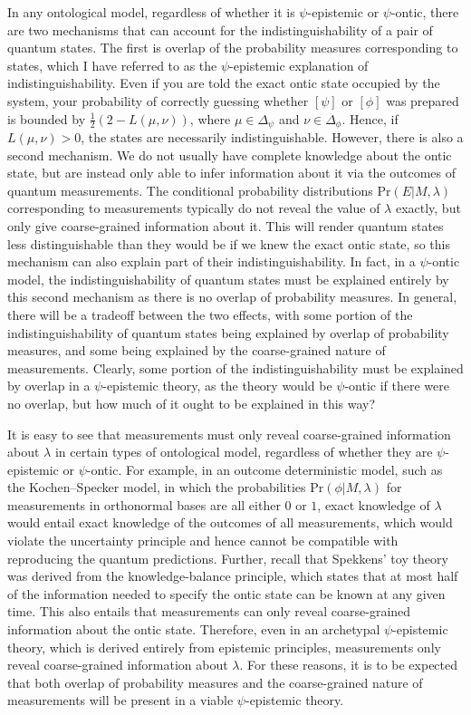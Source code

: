 \documentclass[DIV=calc,fontsize=12pt]{scrartcl} %
\theoremstyle{definition}
\theoremstyle{plain}
\newcommand{\Proj}[1]{\ensuremath{\left [ #1 \right ]}}
\begin{document}
In any ontological model, regardless of whether it is $\psi$-epistemic
or $\psi$-ontic, there are two mechanisms that can account for the
indistinguishability of a pair of quantum states.  The first is
overlap of the probability measures corresponding to states, which I
have referred to as the $\psi$-epistemic explanation of
indistinguishability.  Even if you are told the exact ontic state
occupied by the system, your probability of correctly guessing whether
$\Proj{\psi}$ or $\Proj{\phi}$ was prepared is bounded by $\frac{1}{2}
\left ( 2 - L(\mu,\nu) \right )$, where $\mu \in \Delta_{\psi}$ and
$\nu \in \Delta_{\phi}$.  Hence, if $L(\mu,\nu) > 0$, the states are
necessarily indistinguishable.  However, there is also a second
mechanism.  We do not usually have complete knowledge about the ontic
state, but are instead only able to infer information about it via the
outcomes of quantum measurements.  The conditional probability
distributions $\text{Pr}(E|M,\lambda)$ corresponding to measurements
typically do not reveal the value of $\lambda$ exactly, but only give
coarse-grained information about it.  This will render quantum states
less distinguishable than they would be if we knew the exact ontic
state, so this mechanism can also explain part of their
indistinguishability.  In fact, in a $\psi$-ontic model, the
indistinguishability of quantum states must be explained entirely by
this second mechanism as there is no overlap of probability measures.
In general, there will be a tradeoff between the two effects, with
some portion of the indistinguishability of quantum states being
explained by overlap of probability measures, and some being explained
by the coarse-grained nature of measurements.  Clearly, some portion
of the indistinguishability must be explained by overlap in a
$\psi$-epistemic theory, as the theory would be $\psi$-ontic if there
were no overlap, but how much of it ought to be explained in this way?

It is easy to see that measurements must only reveal coarse-grained
information about $\lambda$ in certain types of ontological model,
regardless of whether they are $\psi$-epistemic or $\psi$-ontic.  For
example, in an outcome deterministic model, such as the Kochen--Specker
model, in which the probabilities $\text{Pr}(\phi|M,\lambda)$ for
measurements in orthonormal bases are all either $0$ or $1$, exact
knowledge of $\lambda$ would entail exact knowledge of the outcomes of
all measurements, which would violate the uncertainty principle and
hence cannot be compatible with reproducing the quantum predictions.
Further, recall that Spekkens' toy theory was derived from the
knowledge-balance principle, which states that at most half of the
information needed to specify the ontic state can be known at any
given time.  This also entails that measurements can only reveal
coarse-grained information about the ontic state.  Therefore, even in
an archetypal $\psi$-epistemic theory, which is derived entirely from
epistemic principles, measurements only reveal coarse-grained
information about $\lambda$.  For these reasons, it is to be expected
that both overlap of probability measures and the coarse-grained
nature of measurements will be present in a viable $\psi$-epistemic
theory.
\end{document}
